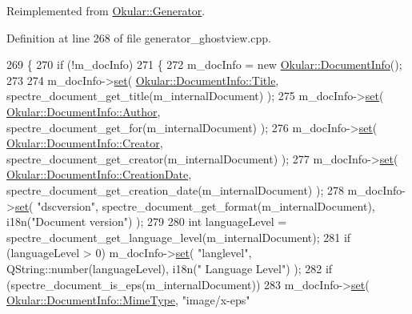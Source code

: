 Reimplemented from \hyperlink{classOkular_1_1Generator_a9993dd0a2415499e23d8394e7a447e98}{Okular\+::\+Generator}.



Definition at line 268 of file generator\+\_\+ghostview.\+cpp.


\begin{DoxyCode}
269 \{
270     \textcolor{keywordflow}{if} (!m\_docInfo)
271     \{
272         m\_docInfo = \textcolor{keyword}{new} \hyperlink{classOkular_1_1DocumentInfo}{Okular::DocumentInfo}();
273 
274         m\_docInfo->\hyperlink{classOkular_1_1DocumentInfo_a8bd5403394ab192f1103cbf2a8e48d9b}{set}( \hyperlink{classOkular_1_1DocumentInfo_a3a6e5f7fb246e29bcb2e830b6f770791ae400626d63f14b61c55bd22aca9481e0}{Okular::DocumentInfo::Title}, 
      spectre\_document\_get\_title(m\_internalDocument) );
275         m\_docInfo->\hyperlink{classOkular_1_1DocumentInfo_a8bd5403394ab192f1103cbf2a8e48d9b}{set}( \hyperlink{classOkular_1_1DocumentInfo_a3a6e5f7fb246e29bcb2e830b6f770791a1010574d070b1925e030c20fef3e7a35}{Okular::DocumentInfo::Author}, 
      spectre\_document\_get\_for(m\_internalDocument) );
276         m\_docInfo->\hyperlink{classOkular_1_1DocumentInfo_a8bd5403394ab192f1103cbf2a8e48d9b}{set}( \hyperlink{classOkular_1_1DocumentInfo_a3a6e5f7fb246e29bcb2e830b6f770791ab361aa9681b157d8d81e52f440bf646f}{Okular::DocumentInfo::Creator}, 
      spectre\_document\_get\_creator(m\_internalDocument) );
277         m\_docInfo->\hyperlink{classOkular_1_1DocumentInfo_a8bd5403394ab192f1103cbf2a8e48d9b}{set}( \hyperlink{classOkular_1_1DocumentInfo_a3a6e5f7fb246e29bcb2e830b6f770791a58a72aeacd3cb08e85d0f9f19b2fe83a}{Okular::DocumentInfo::CreationDate}, 
      spectre\_document\_get\_creation\_date(m\_internalDocument) );
278         m\_docInfo->\hyperlink{classOkular_1_1DocumentInfo_a8bd5403394ab192f1103cbf2a8e48d9b}{set}( \textcolor{stringliteral}{"dscversion"}, spectre\_document\_get\_format(m\_internalDocument), i18n(\textcolor{stringliteral}{"Document
       version"}) );
279 
280         \textcolor{keywordtype}{int} languageLevel = spectre\_document\_get\_language\_level(m\_internalDocument);
281         \textcolor{keywordflow}{if} (languageLevel > 0) m\_docInfo->\hyperlink{classOkular_1_1DocumentInfo_a8bd5403394ab192f1103cbf2a8e48d9b}{set}( \textcolor{stringliteral}{"langlevel"}, QString::number(languageLevel), i18n(\textcolor{stringliteral}{"
      Language Level"}) );
282         \textcolor{keywordflow}{if} (spectre\_document\_is\_eps(m\_internalDocument))
283             m\_docInfo->\hyperlink{classOkular_1_1DocumentInfo_a8bd5403394ab192f1103cbf2a8e48d9b}{set}( \hyperlink{classOkular_1_1DocumentInfo_a3a6e5f7fb246e29bcb2e830b6f770791a786464e8e8c3e6ba1cd74e408487785b}{Okular::DocumentInfo::MimeType}, \textcolor{stringliteral}{"image/x-eps"} 

\end{DoxyCode}
